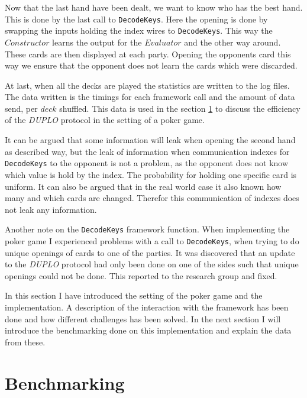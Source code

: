 \documentclass[twoside,11pt,openright]{report}
\newcommand{\DUPLO}{\textit{DUPLO} }
\begin{document}
Now that the last hand have been dealt, we want to know who has the best hand. This is done by the last call to \verb|DecodeKeys|. Here the opening is done by swapping the inputs holding the index wires to \verb|DecodeKeys|. This way the $Constructor$ learns the output for the $Evaluator$ and the other way around. These cards are then displayed at each party. Opening the opponents card this way we ensure that the opponent does not learn the cards which were discarded.

At last, when all the decks are played the statistics are written to the log files. The data written is the timings for each framework call and the amount of data send, per $deck$ shuffled. This data is used in the section \ref{sec:bechmarking} to discuss the efficiency of the \DUPLO protocol in the setting of a poker game.

\bigskip

It can be argued that some information will leak when opening the second hand as described way, but the leak of information when communication indexes for \verb|DecodeKeys| to the opponent is not a problem, as the opponent does not know which value is hold by the index. The probability for holding one specific card is uniform. It can also be argued that in the real world case it also known how many and which cards are changed. Therefor this communication of indexes does not leak any information.

\bigskip

Another note on the \verb|DecodeKeys| framework function. When implementing the poker game I experienced problems with a call to \verb|DecodeKeys|, when trying to do unique openings of cards to one of the parties. It was discovered that an update to the \DUPLO protocol had only been done on one of the sides such that unique openings could not be done. This reported to the research group and fixed.

\bigskip

In this section I have introduced the setting of the poker game and the implementation. A description of the interaction with the framework has been done and how different challenges has been solved. In the next section I will introduce the benchmarking done on this implementation and explain the data from these.

\section{Benchmarking}
\label{sec:bechmarking}
\end{document}
